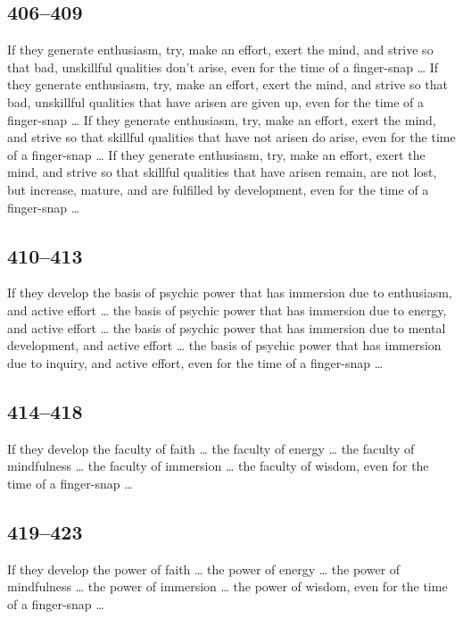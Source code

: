 \documentclass[12pt,openany]{book}%
\begin{document}
\subsection*{406–409 }

If they generate enthusiasm, try, make an effort, exert the mind, and strive so that bad, unskillful qualities don’t arise, even for the time of a finger-snap … If they generate enthusiasm, try, make an effort, exert the mind, and strive so that bad, unskillful qualities that have arisen are given up, even for the time of a finger-snap … If they generate enthusiasm, try, make an effort, exert the mind, and strive so that skillful qualities that have not arisen do arise, even for the time of a finger-snap … If they generate enthusiasm, try, make an effort, exert the mind, and strive so that skillful qualities that have arisen remain, are not lost, but increase, mature, and are fulfilled by development, even for the time of a finger-snap … 

\subsection*{410–413 }

If they develop the basis of psychic power that has immersion due to enthusiasm, and active effort … the basis of psychic power that has immersion due to energy, and active effort … the basis of psychic power that has immersion due to mental development, and active effort … the basis of psychic power that has immersion due to inquiry, and active effort, even for the time of a finger-snap … 

\subsection*{414–418 }

If they develop the faculty of faith … the faculty of energy … the faculty of mindfulness … the faculty of immersion … the faculty of wisdom, even for the time of a finger-snap … 

\subsection*{419–423 }

If they develop the power of faith … the power of energy … the power of mindfulness … the power of immersion … the power of wisdom, even for the time of a finger-snap … 
\end{document}
